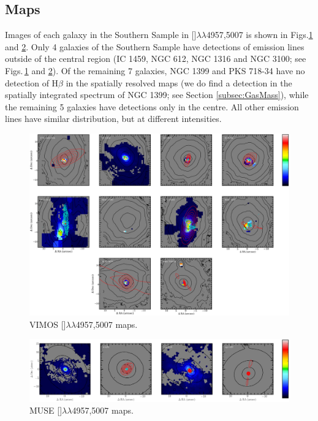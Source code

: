 	\subsection{Maps}
		\label{subsec:GasMaps}
		Images of each galaxy in the Southern Sample in []$\lambda\lambda$4957,5007 is shown in Figs.\ref{fig:VIMOS_OIII} and \ref{fig:MUSE_OIII}. Only 4 galaxies of the Southern Sample have detections of emission lines outside of the central region (IC 1459, NGC 612, NGC 1316 and NGC 3100; see Figs.\,\ref{fig:VIMOS_OIII} and \ref{fig:MUSE_OIII}). Of the remaining 7 galaxies, NGC 1399 and PKS 718-34 have no detection of H$\beta$ in the spatially resolved maps (we do find a detection in the spatially integrated spectrum of NGC 1399; see Section \ref{subsec:GasMass}), while the remaining 5 galaxies have detections only in the centre. All other emission lines have similar distribution, but at different intensities.%


		\begin{figure}
			\centering
			\includegraphics[width=\textwidth]{chapter5/vimos/Hb.png}
			\caption[VIMOS  maps]{VIMOS []$\lambda\lambda$4957,5007 maps.} 
			\label{fig:VIMOS_OIII}
		\end{figure}
		\begin{figure}
			\centering
			\includegraphics[width=\textwidth]{chapter5/muse/Hb.png}
			\caption[MUSE  maps]{MUSE []$\lambda\lambda$4957,5007 maps.} 
			\label{fig:MUSE_OIII}
		\end{figure}


